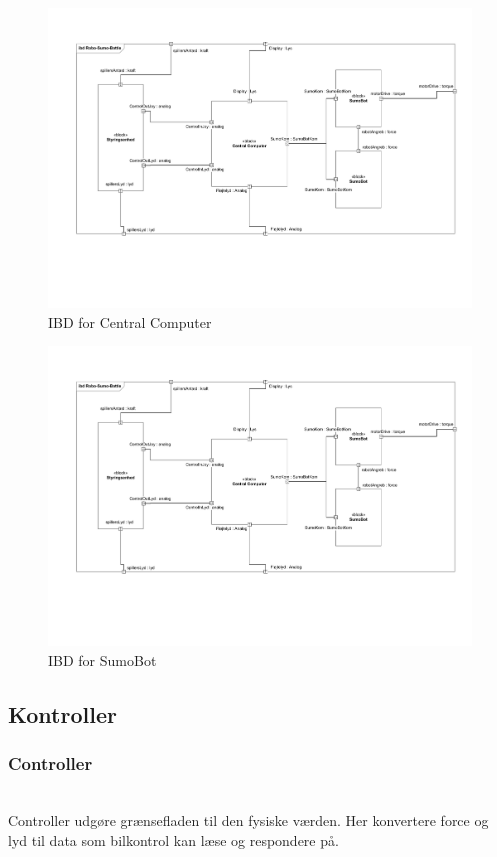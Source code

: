 \begin{figure}
	\centering
   	\includegraphics[page=3,width=1\linewidth]{figs/Diagrammer/IBD.pdf}
	\caption{IBD for Central Computer}
	\label{fig:IBD_CentralComputer}
\end{figure}

\begin{figure}
	\centering
   	\includegraphics[page=4,width=1\linewidth]{figs/Diagrammer/IBD.pdf}
	\caption{IBD for SumoBot}
	\label{fig:IBD_SumoBot}
\end{figure}

\subsection{Kontroller} 
\subsubsection*{\textbf{Controller}}\hfill\\
Controller udgøre grænsefladen til den fysiske værden. Her konvertere force og lyd til data som bilkontrol kan læse og respondere på.
